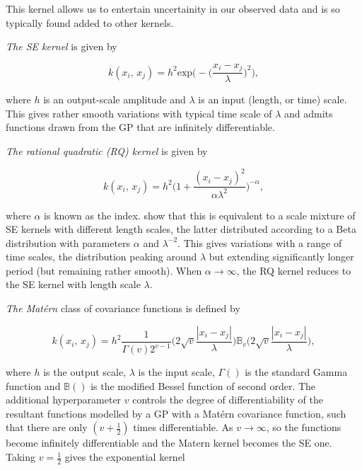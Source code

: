          This kernel allows us to entertain uncertainity in our observed data and is so typically found added to other kernels.

         \vspace{1em}

         \textit{The SE kernel} is given by

         \[k(x_{i}, \, x_{j}) = h^{2} \text{exp} \bigg(- \Big(\frac{x_i - x_j}{\lambda} \Big)^2 \bigg),\]

         where \(h\) is an output-scale amplitude and \(\lambda\) is an input (length, or time) scale. This gives rather smooth variations with typical time scale of \(\lambda\) and admits functions drawn from the GP that are infinitely differentiable.

         \vspace{1em}

         \textit{The rational quadratic (RQ) kernel} is given by

         \[k(x_{i}, \, x_{j}) = h^{2} \bigg(1 + \frac{(x_{i} - x_{j})^2}{\alpha\lambda^2} \bigg)^{-\alpha},\]

         where \(\alpha\) is known as the index. \cite{Rasmussen2006} show that this is equivalent to a scale mixture of SE kernels with different length scales, the latter distributed according to a Beta distribution with parameters \(\alpha\) and \(\lambda^{-2}\). This gives variations with a range of time scales, the distribution peaking around \(\lambda\) but extending significantly longer period (but remaining rather smooth). When \(\alpha \to \infty\), the RQ kernel reduces to the SE kernel with length scale \(\lambda\).

         \vspace{1em}

         \textit{The Mat\'ern} class of covariance functions is defined by

         \[k(x_{i}, \, x_{j}) = h^{2} \frac{1}{\Gamma(v)2^{v-1}} \bigg(2\sqrt{v}\frac{|x_{i} - x_{j}|}{\lambda} \bigg) \mathbb{B}_{v} \bigg(2\sqrt{v}\frac{|x_{i} - x_{j}|}{\lambda} \bigg),\]

         where \(h\) is the output scale, \(\lambda\) is the input scale, \(\Gamma()\) is the standard Gamma function and \(\mathbb{B}()\) is the modified Bessel function of second order. The additional hyperparameter \(v\) controls the degree of differentiability of the resultant functions modelled by a GP with a Mat\'ern covariance function, such that there are only \((v + \frac{1}{2})\) times differentiable. As \(v \to \infty\), so the functions become infinitely differentiable and the Matern kernel becomes the SE one. Taking \(v = \frac{1}{2}\) gives the exponential kernel


